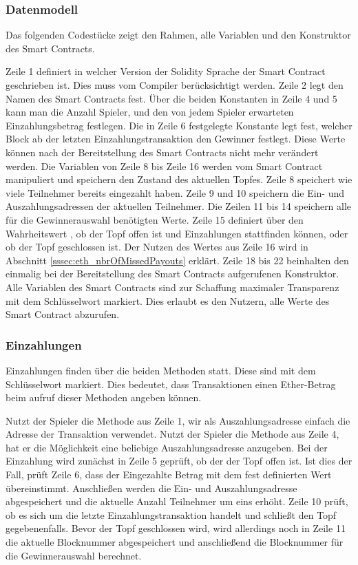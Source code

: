 \subsubsection{Datenmodell}
Das folgenden Codestücke zeigt den Rahmen, alle Variablen und den Konstruktor des Smart Contracts.

Zeile 1 definiert in welcher Version der Solidity Sprache der Smart Contract geschrieben ist. Dies muss vom Compiler berücksichtigt werden. Zeile 2 legt den Namen des Smart Contracts fest. Über die beiden Konstanten in Zeile 4 und 5 kann man die Anzahl Spieler, und den von jedem Spieler erwarteten Einzahlungsbetrag festlegen. Die in Zeile 6 festgelegte Konstante legt fest, welcher Block ab der letzten Einzahlungstransaktion den Gewinner festlegt. Diese Werte können nach der Bereitstellung des Smart Contracts nicht mehr verändert werden. Die Variablen von Zeile 8 bis Zeile 16 werden vom Smart Contract manipuliert und speichern den Zustand des aktuellen Topfes. Zeile 8 speichert wie viele Teilnehmer bereits eingezahlt haben. Zeile 9 und 10 speichern die Ein- und Auszahlungsadressen der aktuellen Teilnehmer. Die Zeilen 11 bis 14 speichern alle für die Gewinnerauswahl benötigten Werte. Zeile 15 definiert über den Wahrheitswert , ob der Topf offen ist und Einzahlungen stattfinden können, oder ob der Topf geschlossen ist. Der Nutzen des Wertes aus Zeile 16 wird in Abschnitt \ref{sssec:eth_nbrOfMissedPayouts} erklärt. Zeile 18 bis 22 beinhalten den einmalig bei der Bereitstellung des Smart Contracts aufgerufenen Konstruktor. Alle Variablen des Smart Contracts sind zur Schaffung maximaler Transparenz mit dem Schlüsselwort  markiert. Dies erlaubt es den Nutzern, alle Werte des Smart Contract abzurufen.

\subsubsection{Einzahlungen}
Einzahlungen finden über die beiden  Methoden statt. Diese sind mit dem Schlüsselwort  markiert. Dies bedeutet, dass Transaktionen einen Ether-Betrag beim aufruf dieser Methoden angeben können.

Nutzt der Spieler die Methode aus Zeile 1, wir als Auszahlungsadresse einfach die Adresse der Transaktion verwendet. Nutzt der Spieler die Methode aus Zeile 4, hat er die Möglichkeit eine beliebige Auszahlungsadresse anzugeben. Bei der Einzahlung wird zunächst in Zeile 5 geprüft, ob der der Topf offen ist. Ist dies der Fall, prüft Zeile 6, dass der Eingezahlte Betrag mit dem fest definierten Wert übereinstimmt. Anschließen werden die Ein- und Auszahlungsadresse abgespeichert und die aktuelle Anzahl Teilnehmer um eins erhöht. Zeile 10 prüft, ob es sich um die letzte Einzahlungstransaktion handelt und schließt den Topf gegebenenfalls. Bevor der Topf geschlossen wird, wird allerdings noch in Zeile 11 die aktuelle Blocknummer abgespeichert und anschließend die Blocknummer für die Gewinnerauswahl berechnet.

